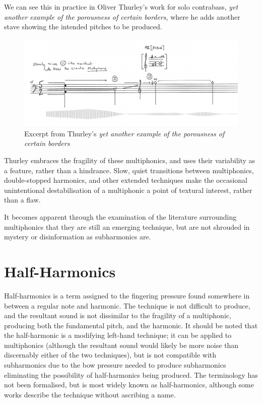 We can see this in practice in Oliver Thurley's work for solo contrabass, \emph{yet another example of the porousness of certain borders}, where he adds another stave showing the intended pitches to be produced.\autocite{thurleyAnotherExamplePorousness2014}

  \begin{figure}
    \includegraphics[width=\linewidth]{./resources/thurleyMultiphonicNotation.png}
    \caption{Excerpt from Thurley's \emph{yet another example of the porousness of certain borders}}
\label{fig:Excerpt from Thurley's `yet another example of the porousness of certain borders'}
  \end{figure}

Thurley embraces the fragility of these multiphonics, and uses their variability as a feature, rather than a hindrance. 
Slow, quiet transitions between multiphonics, double-stopped harmonics, and other extended techniques make the occasional unintentional destabilisation of a multiphonic a point of textural interest, rather than a flaw.

It becomes apparent through the examination of the literature surrounding multiphonics that they are still an emerging technique, but are not shrouded in mystery or disinformation as subharmonics are.

\newpage
\section{Half-Harmonics} \label{sec:halfHarmonicsDiscussion}
Half-harmonics is a term assigned to the fingering pressure found somewhere in between a regular note and harmonic. 
The technique is not difficult to produce, and the resultant sound is not dissimilar to the fragility of a multiphonic, producing both the fundamental pitch, and the harmonic. 
It should be noted that the half-harmonic is a modifying left-hand technique; it can be applied to multiphonics (although the resultant sound would likely be more noise than discernably either of the two techniques), but is not compatible with subharmonics due to the bow pressure needed to produce subharmonics eliminating the possibility of half-harmonics being produced.
The terminology has not been formalised, but is most widely known as half-harmonics, although some works describe the technique without ascribing a name.

